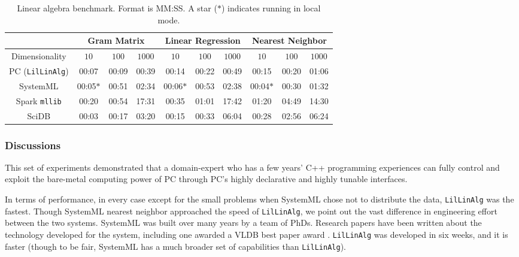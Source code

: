 \begin{table}[h!]
\begin{center}
\begin{tabular}{|c||c|c|c||c|c|c||c|c|c||}
\hline
& \multicolumn{3}{c||}{Gram Matrix} & \multicolumn{3}{c||}{Linear Regression} & \multicolumn{3}{c||}{Nearest Neighbor} \\
\hline
Dimensionality & $10$ & $100$ & $1000$& $10$ & $100$ & $1000$& $10$ & $100$ & $1000$ \\
\hline
\hline
PC (\texttt{LilLinAlg}) &00:07 & 00:09 &00:39 &00:14 &00:22 &00:49& 00:15 & 00:20 & 01:06 \\
SystemML &00:05$*$ &00:51 &02:34 &00:06$*$ &00:53 &02:38 &00:04$*$ &00:30 &01:32 \\
Spark \texttt{mllib} &00:20  &00:54 &17:31 &00:35 &01:01 &17:42 &01:20 & 04:49 &14:30 \\
SciDB   &00:03 &00:17 &03:20 &00:15 &00:33 &06:04 &00:28 &02:56 & 06:24 \\
\hline
\end{tabular}
\caption{Linear algebra benchmark. Format is MM:SS.
A star ($*$) indicates running in local mode.}
\label{fig:LR}
\end{center}
\end{table}

\subsubsection {Discussions}
This set of experiments demonstrated that a
domain-expert who has a few years' C++ programming experiences can fully control and
exploit the bare-metal computing power of PC through PC's highly
declarative and highly tunable interfaces.

In terms of performance, in every case except for the small problems when SystemML chose not to distribute the data,
\texttt{LilLinAlg} was the fastest.  
Though SystemML nearest neighbor approached the speed of 
\texttt{LilLinAlg}, we point out the vast difference in engineering effort between the two systems.  
SystemML was built over many years by a team of PhDs. Research papers have been written about the
technology developed for the system, including one awarded a VLDB best paper award \cite{boehm2016systemml}.
\texttt{LilLinAlg} was developed in six weeks, and it is faster (though to be fair, SystemML has a much broader
set of capabilities than \texttt{LilLinAlg}).


